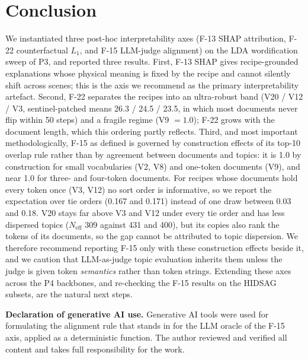 \documentclass[journal,a4paper,10pt]{IEEEtran}
\begin{document}
\section{Conclusion}\label{sec:conclusion}

We instantiated three post-hoc interpretability axes (F-13 SHAP
attribution, F-22 counterfactual $L_1$, and F-15 LLM-judge alignment)
on the LDA wordification sweep of P3, and reported three results.
First, F-13 SHAP gives recipe-grounded explanations whose physical
meaning is fixed by the recipe and cannot silently shift across scenes;
this is the axis we recommend as the primary interpretability artefact.
Second, F-22 separates the recipes into an ultra-robust band (V20 / V12 /
V3, sentinel-patched means 26.3 / 24.5 / 23.5, in which most documents
never flip within 50 steps) and a fragile regime (V9 $=1.0$); F-22
grows with the document length, which this ordering partly reflects.
Third, and most important methodologically, F-15 as defined is
governed by construction effects of its top-10 overlap rule rather
than by agreement between documents and topics: it is 1.0 by
construction for small vocabularies (V2, V8) and one-token documents
(V9), and near 1.0 for three- and four-token documents. For recipes
whose documents hold every token once (V3, V12) no sort order is
informative, so we report the expectation over tie orders (0.167 and
0.171) instead of one draw between 0.03 and 0.18. V20 stays far above
V3 and V12 under every tie order and has less dispersed topics
($N_{\mathrm{eff}}$ 309 against 431 and 400), but its copies also rank
the tokens of its documents, so the gap cannot be attributed to topic
dispersion. We therefore recommend reporting F-15 only with these
construction effects beside it, and we caution that LLM-as-judge topic
evaluation inherits them unless the judge is given token
\emph{semantics} rather than token strings. Extending these axes across
the P4 backbones, and re-checking the F-15 results on the HIDSAG
subsets, are the natural next steps.

\medskip
\noindent\textbf{Declaration of generative AI use.} Generative AI tools
were used for formulating the alignment rule that stands in for the LLM
oracle of the F-15 axis, applied as a deterministic function. The author
reviewed and verified all content and takes full responsibility for the
work.



\end{document}
